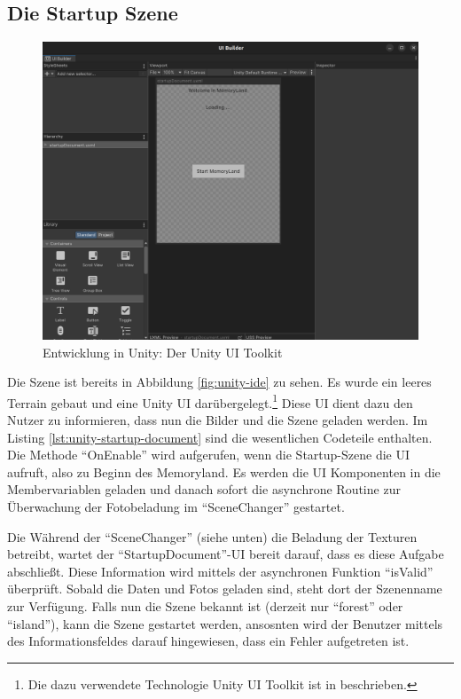 \subsection{Die Startup Szene}
\label{subsec:unity-startup-scene}


\begin{figure} [h t]
    \centering
    \includegraphics[scale=0.12]{pics/unity-ui-builder.png}
    \caption{Entwicklung in Unity: Der Unity UI Toolkit}
    \label{fig:unity-ui-builder}
\end{figure}


Die Szene ist bereits in Abbildung \ref{fig:unity-ide} zu sehen. Es wurde ein leeres Terrain gebaut und eine Unity UI darübergelegt.\footnote{Die dazu verwendete Technologie Unity UI Toolkit ist in \cite{UnityDocsUIToolkit} beschrieben.} Diese UI dient dazu den Nutzer zu informieren, dass nun die Bilder und die Szene geladen werden. Im Listing \ref{lst:unity-startup-document} sind die wesentlichen Codeteile enthalten. Die Methode ``OnEnable'' wird aufgerufen, wenn die Startup-Szene die UI aufruft, also zu Beginn des Memoryland. Es werden die UI Komponenten in die Membervariablen geladen und danach sofort die asynchrone Routine zur Überwachung der Fotobeladung im ``SceneChanger'' gestartet. 


Die Während der ``SceneChanger'' (siehe unten) die Beladung der Texturen betreibt, wartet der ``StartupDocument''-UI bereit darauf, dass es diese Aufgabe abschlie\ss{}t. Diese Information wird mittels der asynchronen Funktion ``isValid'' überprüft. Sobald die Daten und Fotos geladen sind, steht dort der Szenenname zur Verfügung. Falls nun die Szene bekannt ist (derzeit nur ``forest'' oder ``island''), kann die Szene gestartet werden, ansosnten wird der Benutzer mittels des Informationsfeldes darauf hingewiesen, dass ein Fehler aufgetreten ist.



